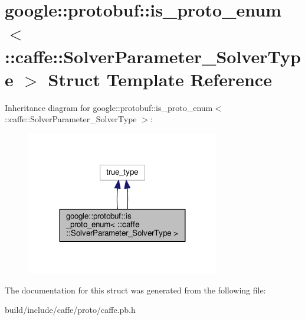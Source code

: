 \hypertarget{structgoogle_1_1protobuf_1_1is__proto__enum_3_01_1_1caffe_1_1_solver_parameter___solver_type_01_4}{}\section{google\+:\+:protobuf\+:\+:is\+\_\+proto\+\_\+enum$<$ \+:\+:caffe\+:\+:Solver\+Parameter\+\_\+\+Solver\+Type $>$ Struct Template Reference}
\label{structgoogle_1_1protobuf_1_1is__proto__enum_3_01_1_1caffe_1_1_solver_parameter___solver_type_01_4}


Inheritance diagram for google\+:\+:protobuf\+:\+:is\+\_\+proto\+\_\+enum$<$ \+:\+:caffe\+:\+:Solver\+Parameter\+\_\+\+Solver\+Type $>$\+:
\nopagebreak
\begin{figure}[H]
\begin{center}
\leavevmode
\includegraphics[width=239pt]{structgoogle_1_1protobuf_1_1is__proto__enum_3_01_1_1caffe_1_1_solver_parameter___solver_type_01_4__inherit__graph}
\end{center}
\end{figure}


The documentation for this struct was generated from the following file\+:\begin{DoxyCompactItemize}
\item 
build/include/caffe/proto/caffe.\+pb.\+h\end{DoxyCompactItemize}
